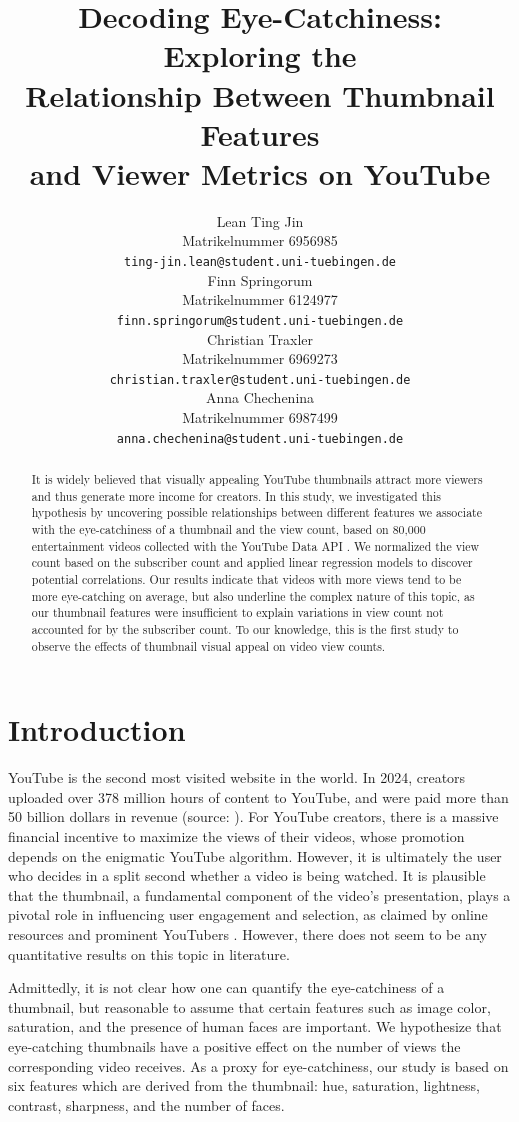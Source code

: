 \documentclass{article}
\title{Decoding Eye-Catchiness: Exploring the\\Relationship Between Thumbnail Features\\and Viewer Metrics on YouTube}
\author{%
  Lean Ting Jin\\
  Matrikelnummer 6956985\\
  \fontsize{8.5}{11}\texttt{ting-jin.lean@student.uni-tuebingen.de} \\
  \And
  Finn Springorum\\
  Matrikelnummer 6124977\\
  \fontsize{8.5}{11}\texttt{finn.springorum@student.uni-tuebingen.de} \\
  \And
  Christian Traxler\\
  Matrikelnummer 6969273\\
  \fontsize{8.5}{11}\texttt{christian.traxler@student.uni-tuebingen.de} \\
  \And
  Anna Chechenina\\
  Matrikelnummer 6987499\\
  \fontsize{8.5}{11}\texttt{anna.chechenina@student.uni-tuebingen.de} \\
}
\begin{document}
\maketitle

\begin{abstract}
  It is widely believed that visually appealing YouTube thumbnails attract more viewers and thus generate more income for creators. In this study, we investigated this hypothesis by uncovering possible relationships between different features we associate with the eye-catchiness of a thumbnail and the view count, based on 80,000 entertainment videos collected with the YouTube Data API \cite{youtubeapi}. We normalized the view count based on the subscriber count and applied linear regression models to discover potential correlations. Our results indicate that videos with more views tend to be more eye-catching on average, but also underline the complex nature of this topic, as our thumbnail features were insufficient to explain variations in view count not accounted for by the subscriber count. To our knowledge, this is the first study to observe the effects of thumbnail visual appeal on video view counts.

\end{abstract}

\section{Introduction}
YouTube is the second most visited website in the world. In 2024, creators uploaded over 378 million hours of content to YouTube, and were paid more than 50 billion dollars in revenue (source: \cite{youtube-stats}). For YouTube creators, there is a massive financial incentive to maximize the views of their videos, whose promotion depends on the enigmatic YouTube algorithm. However, it is ultimately the user who decides in a split second whether a video is being watched. It is plausible that the thumbnail, a fundamental component of the video's presentation, plays a pivotal role in influencing user engagement and selection, as claimed by online resources \cite{} and prominent YouTubers \cite{}. However, there does not seem to be any quantitative results on this topic in literature.


Admittedly, it is not clear how one can quantify the eye-catchiness of a thumbnail, but reasonable to assume that certain features such as image color, saturation, and the presence of human faces are important. We hypothesize that eye-catching thumbnails have a positive effect on the number of views the corresponding video receives. As a proxy for eye-catchiness, our study is based on six features which are derived from the thumbnail: hue, saturation, lightness, contrast, sharpness, and the number of faces.
\end{document}
